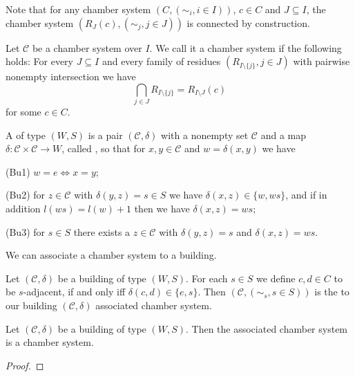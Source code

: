 Note that for any chamber system $(C,(\sim_i, i \in I))$, $c \in C$ and $J \subseteq I$, the chamber system $(R_J(c), (\sim_j, j \in J))$ is connected by construction.

\begin{defi}
	Let $\mathcal{C}$ be a chamber system over $I$. We call it a  chamber system if the following holds: For every $J \subseteq I$ and every family of residues $(R_{I \setminus \{j\}}, j \in J)$ with pairwise nonempty intersection we have
	$$ \bigcap_{j \in J} R_{I \setminus \{j\}} = R_{I \setminus J}(c) $$
	for some $c \in C$.
\end{defi}

\begin{defi}
	A  of type $(W,S)$ is a pair $(\mathcal{C}, \delta)$ with a nonempty set $\mathcal{C}$ and a map $\delta : \mathcal{C} \times \mathcal{C} \to W$, called , so that for $x,y \in \mathcal C$ and $w = \delta(x,y)$ we have
	\begin{axioms}
		\item[(Bu1)] $w = e \iff x = y$;
		\item[(Bu2)] for $z \in \mathcal C$ with $\delta(y,z) = s \in S$ we have $\delta(x,z) \in \{w,ws\}$, and if in addition $l(ws) = l(w) + 1$ then we have $\delta(x,z) = ws$;
		\item[(Bu3)] for $s \in S$ there exists a $z \in \mathcal C$ with $\delta(y,z) = s$ and $\delta(x,z) = ws$.
	\end{axioms}
\end{defi}

We can associate a chamber system to a building.

\begin{defi}
	Let $(\mathcal{C}, \delta)$ be a building of type $(W,S)$. For each $s \in S$ we define $c,d \in C$ to be $s$-adjacent, if and only iff $\delta(c,d) \in \{e,s\}$. Then $(\mathcal{C}, (\sim_s, s \in S))$ is the to our building $(\mathcal{C}, \delta)$ associated chamber system.
\end{defi}

\begin{lemm}
	Let $(\mathcal{C}, \delta)$ be a building of type $(W,S)$. Then the associated chamber system is a chamber system.

	\begin{proof}
		
	\end{proof}
\end{lemm}